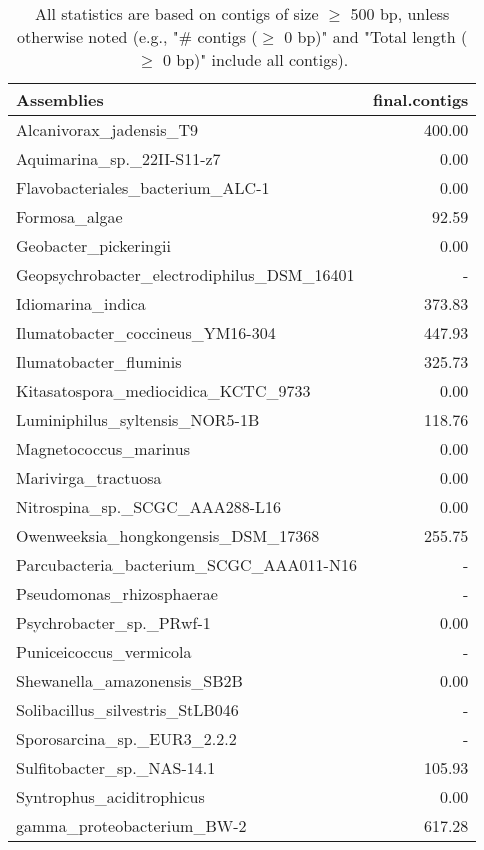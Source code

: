 \documentclass[12pt,a4paper]{article}
\begin{document}
\begin{table}[ht]
\begin{center}
\caption{All statistics are based on contigs of size $\geq$ 500 bp, unless otherwise noted (e.g., "\# contigs ($\geq$ 0 bp)" and "Total length ($\geq$ 0 bp)" include all contigs).}
\begin{tabular}{|l*{1}{|r}|}
\hline
Assemblies & final.contigs \\ \hline
Alcanivorax\_jadensis\_T9 & 400.00 \\ \hline
Aquimarina\_sp.\_22II-S11-z7 & 0.00 \\ \hline
Flavobacteriales\_bacterium\_ALC-1 & 0.00 \\ \hline
Formosa\_algae & 92.59 \\ \hline
Geobacter\_pickeringii & 0.00 \\ \hline
Geopsychrobacter\_electrodiphilus\_DSM\_16401 & - \\ \hline
Idiomarina\_indica & 373.83 \\ \hline
Ilumatobacter\_coccineus\_YM16-304 & 447.93 \\ \hline
Ilumatobacter\_fluminis & 325.73 \\ \hline
Kitasatospora\_mediocidica\_KCTC\_9733 & 0.00 \\ \hline
Luminiphilus\_syltensis\_NOR5-1B & 118.76 \\ \hline
Magnetococcus\_marinus & 0.00 \\ \hline
Marivirga\_tractuosa & 0.00 \\ \hline
Nitrospina\_sp.\_SCGC\_AAA288-L16 & 0.00 \\ \hline
Owenweeksia\_hongkongensis\_DSM\_17368 & 255.75 \\ \hline
Parcubacteria\_bacterium\_SCGC\_AAA011-N16 & - \\ \hline
Pseudomonas\_rhizosphaerae & - \\ \hline
Psychrobacter\_sp.\_PRwf-1 & 0.00 \\ \hline
Puniceicoccus\_vermicola & - \\ \hline
Shewanella\_amazonensis\_SB2B & 0.00 \\ \hline
Solibacillus\_silvestris\_StLB046 & - \\ \hline
Sporosarcina\_sp.\_EUR3\_2.2.2 & - \\ \hline
Sulfitobacter\_sp.\_NAS-14.1 & 105.93 \\ \hline
Syntrophus\_aciditrophicus & 0.00 \\ \hline
gamma\_proteobacterium\_BW-2 & 617.28 \\ \hline
\end{tabular}
\end{center}
\end{table}
\end{document}
